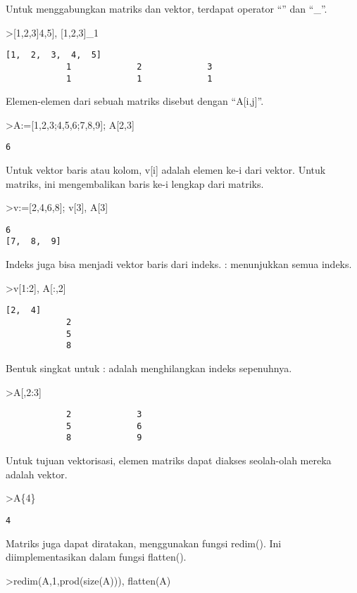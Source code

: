 \documentclass[
]{book}
\begin{document}
Untuk menggabungkan matriks dan vektor, terdapat operator ``\textbar{}'' dan ``\_''.

\textgreater{[}1,2,3{]}\textbar{[}4,5{]}, {[}1,2,3{]}\_1

\begin{verbatim}
[1,  2,  3,  4,  5]
            1             2             3 
            1             1             1 
\end{verbatim}

Elemen-elemen dari sebuah matriks disebut dengan ``A{[}i,j{]}''.

\textgreater A:={[}1,2,3;4,5,6;7,8,9{]}; A{[}2,3{]}

\begin{verbatim}
6
\end{verbatim}

Untuk vektor baris atau kolom, v{[}i{]} adalah elemen ke-i dari vektor. Untuk matriks, ini mengembalikan baris ke-i lengkap dari matriks.

\textgreater v:={[}2,4,6,8{]}; v{[}3{]}, A{[}3{]}

\begin{verbatim}
6
[7,  8,  9]
\end{verbatim}

Indeks juga bisa menjadi vektor baris dari indeks. : menunjukkan semua indeks.

\textgreater v{[}1:2{]}, A{[}:,2{]}

\begin{verbatim}
[2,  4]
            2 
            5 
            8 
\end{verbatim}

Bentuk singkat untuk : adalah menghilangkan indeks sepenuhnya.

\textgreater A{[},2:3{]}

\begin{verbatim}
            2             3 
            5             6 
            8             9 
\end{verbatim}

Untuk tujuan vektorisasi, elemen matriks dapat diakses seolah-olah mereka adalah vektor.

\textgreater A\{4\}

\begin{verbatim}
4
\end{verbatim}

Matriks juga dapat diratakan, menggunakan fungsi redim(). Ini diimplementasikan dalam fungsi flatten().

\textgreater redim(A,1,prod(size(A))), flatten(A)
\end{document}

